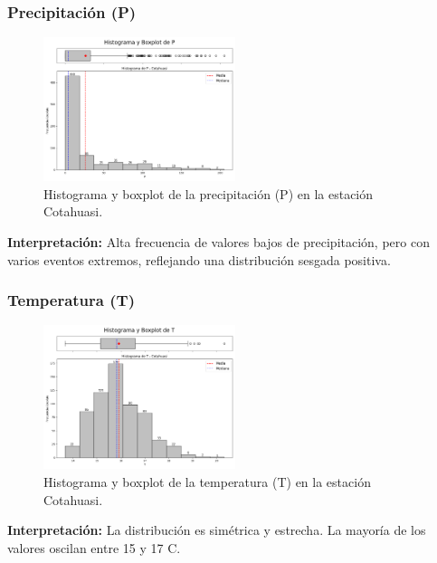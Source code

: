 \subsubsection*{Precipitación (P)}
\begin{figure}[H]
\centering
\includegraphics[width=0.5\textwidth]{resultados/por_estacion_meteorologica/Cotahuasi/P_histograma.png}
\caption{Histograma y boxplot de la precipitación (P) en la estación Cotahuasi.}
\label{fig:cotahuasi_P}
\end{figure}
\textbf{Interpretación:} Alta frecuencia de valores bajos de precipitación, pero con varios eventos extremos, reflejando una distribución sesgada positiva.

\subsubsection*{Temperatura (T)}
\begin{figure}[H]
\centering
\includegraphics[width=0.5\textwidth]{resultados/por_estacion_meteorologica/Cotahuasi/T_histograma.png}
\caption{Histograma y boxplot de la temperatura (T) en la estación Cotahuasi.}
\label{fig:cotahuasi_T}
\end{figure}
\textbf{Interpretación:} La distribución es simétrica y estrecha. La mayoría de los valores oscilan entre 15 y 17 \textdegree C.


